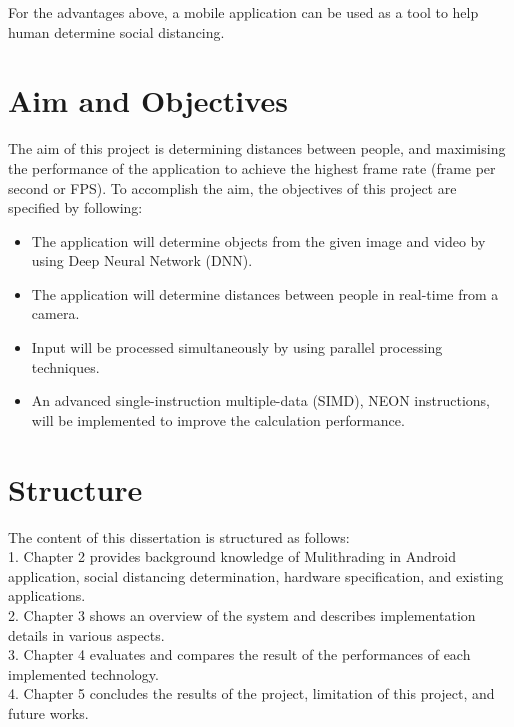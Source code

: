         For the advantages above, a mobile application can be used as a tool to help human determine social distancing.

    \section{Aim and Objectives}
        The aim of this project is determining distances between people,
        and maximising the performance of the application to achieve the highest frame rate (frame per second or FPS).
        To accomplish the aim, the objectives of this project are specified by following:
        \begin{itemize}
            \setlength\itemsep{1em}
            \item The application will determine objects from the given image and video by using Deep Neural Network (DNN).
            \item The application will determine distances between people in real-time from a camera.
            \item Input will be processed simultaneously by using parallel processing techniques.
            \item An advanced single-instruction multiple-data (SIMD), NEON instructions, will be implemented to improve the calculation performance.
        \end{itemize}

    \section{Structure}
        The content of this dissertation is structured as follows: \\
        1.  Chapter 2 provides background knowledge of Mulithrading in Android application,
            social distancing determination, hardware specification, and existing applications. \\
        2.  Chapter 3 shows an overview of the system and describes implementation details in various aspects.  \\
        3.  Chapter 4 evaluates and compares the result of the performances of each implemented technology. \\
        4.  Chapter 5 concludes the results of the project, limitation of this project, and future works.  \\

